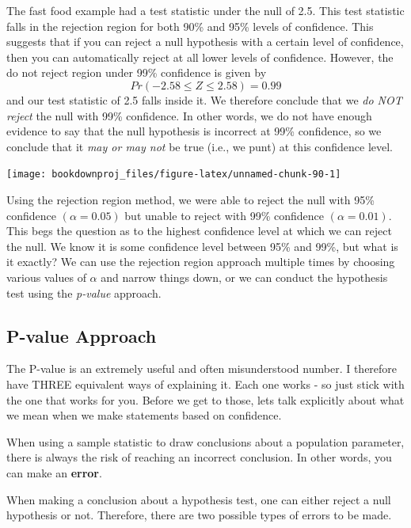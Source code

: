 \documentclass[
]{book}
\begin{document}
The fast food example had a test statistic under the null of 2.5. This test statistic falls in the rejection region for both 90\% and 95\% levels of confidence. This suggests that if you can reject a null hypothesis with a certain level of confidence, then you can automatically reject at all lower levels of confidence. However, the do not reject region under 99\% confidence is given by
\[Pr(-2.58 \leq Z \leq 2.58)=0.99\]
and our test statistic of 2.5 falls inside it. We therefore conclude that we \emph{do NOT reject} the null with 99\% confidence. In other words, we do not have enough evidence to say that the null hypothesis is incorrect at 99\% confidence, so we conclude that it \emph{may or may not} be true (i.e., we punt) at this confidence level.

\begin{center}\texttt{[image: bookdownproj\_files/figure-latex/unnamed-chunk-90-1]} \end{center}

Using the rejection region method, we were able to reject the null with 95\% confidence \((\alpha=0.05)\) but unable to reject with 99\% confidence \((\alpha=0.01)\). This begs the question as to the highest confidence level at which we can reject the null. We know it is some confidence level between 95\% and 99\%, but what is it exactly? We can use the rejection region approach multiple times by choosing various values of \(\alpha\) and narrow things down, or we can conduct the hypothesis test using the \emph{p-value} approach.

\hypertarget{p-value-approach}{%
\subsection{P-value Approach}\label{p-value-approach}}

The P-value is an extremely useful and often misunderstood number. I therefore have THREE equivalent ways of explaining it. Each one works - so just stick with the one that works for you. Before we get to those, lets talk explicitly about what we mean when we make statements based on confidence.

When using a sample statistic to draw conclusions about a population parameter, there is always the risk of reaching an incorrect conclusion. In other words, you can make an \textbf{error}.

When making a conclusion about a hypothesis test, one can either reject a null hypothesis or not. Therefore, there are two possible types of errors to be made.
\end{document}
